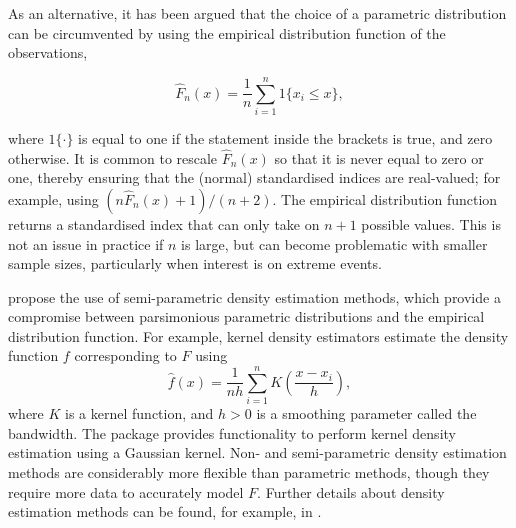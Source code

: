 As an alternative, it has been argued \citep[e.g.][]{ErhardtCzado2018,HaoEtAl2019,AllenOtero2023} that the choice of a parametric distribution can be circumvented by using the empirical distribution function of the observations,

\begin{equation}
\hat{F}_{n}(x) = \frac{1}{n} \sum_{i=1}^{n} 1 \{ x_{i} \leq x \},
\end{equation}

where \(1\{ \cdot \}\) is equal to one if the statement inside the brackets is true, and zero otherwise. It is common to rescale \(\hat{F}_{n}(x)\) so that it is never equal to zero or one, thereby ensuring that the (normal) standardised indices are real-valued; for example, using \((n \hat{F}_{n}(x) + 1)/(n + 2)\). The empirical distribution function returns a standardised index that can only take on \(n + 1\) possible values. This is not an issue in practice if \(n\) is large, but can become problematic with smaller sample sizes, particularly when interest is on extreme events.

\cite{AllenOtero2023} propose the use of semi-parametric density estimation methods, which provide a compromise between parsimonious parametric distributions and the empirical distribution function. For example, kernel density estimators estimate the density function \(f\) corresponding to \(F\) using
\[
\hat{f}(x) = \frac{1}{nh} \sum_{i=1}^{n} K \left( \frac{x - x_{i}}{h} \right),
\]
where \(K\) is a kernel function, and \(h > 0\) is a smoothing parameter called the bandwidth. The  package provides functionality to perform kernel density estimation using a Gaussian kernel. Non- and semi-parametric density estimation methods are considerably more flexible than parametric methods, though they require more data to accurately model \(F\). Further details about density estimation methods can be found, for example, in \cite{Silverman2018}.

